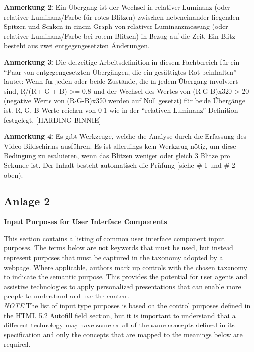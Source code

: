 \textbf{Anmerkung 2:} Ein Übergang ist der Wechsel in relativer Luminanz (oder relativer Luminanz/Farbe für rotes Blitzen) zwischen nebeneinander liegenden Spitzen und Senken in einem Graph von relativer Luminanzmessung (oder relativer Luminanz/Farbe bei rotem Blitzen) in Bezug auf die Zeit. Ein Blitz besteht aus zwei entgegengesetzten Änderungen.

\textbf{Anmerkung 3:} Die derzeitige Arbeitsdefinition in diesem Fachbereich für ein "`Paar von entgegengesetzten Übergängen, die ein gesättigtes Rot beinhalten"' lautet: Wenn für jeden oder beide Zustände, die in jedem Übergang involviert sind, R/(R+ G + B) >= 0.8 und der Wechsel des Wertes von (R-G-B)x320 > 20 (negative Werte von (R-G-B)x320 werden auf Null gesetzt) für beide Übergänge ist. R, G, B Werte reichen von 0-1 wie in der "`relativen Luminanz"'-Definition festgelegt. [HARDING-BINNIE]

\textbf{Anmerkung 4:} Es gibt Werkzeuge, welche die Analyse durch die Erfassung des Video-Bildschirms ausführen. Es ist allerdings kein Werkzeug nötig, um diese Bedingung zu evaluieren, wenn das Blitzen weniger oder gleich 3 Blitze pro Sekunde ist. Der Inhalt besteht automatisch die Prüfung (siehe \# 1 und \# 2 oben).

\appendix

\subsection*{Anlage 2}
\label{subsec: Anlage2}

\textbf{Input Purposes for User Interface Components}


\noindent This section contains a listing of common user interface component input purposes. The terms below are not keywords that must be used, but instead represent purposes that must be captured in the taxonomy adopted by a webpage. Where applicable, authors mark up controls with the chosen taxonomy to indicate the semantic purpose. This provides the potential for user agents and assistive technologies to apply personalized presentations that can enable more people to understand and use the content.\\

\noindent \textit{NOTE}
The list of input type purposes is based on the control purposes defined in the HTML 5.2 Autofill field section, but it is important to understand that a different technology may have some or all of the same concepts defined in its specification and only the concepts that are mapped to the meanings below are required.\\

